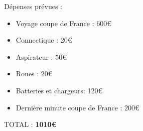\begin{frame}
   Dépenses prévues :
   \begin{itemize}
       \item Voyage coupe de France : 600€
       \item Connectique : 20€
       \item Aspirateur : 50€
       \item Roues : 20€
       \item Batteries et chargeurs: 120€
       \item Dernière minute coupe de France : 200€
   \end{itemize}
   TOTAL : \textbf{1010€}
\end{frame}
